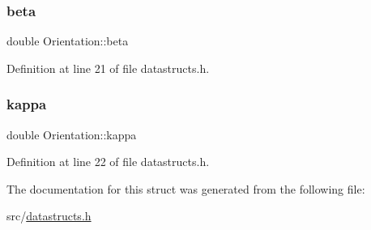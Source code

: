 \subsubsection{\texorpdfstring{beta}{beta}}
{\footnotesize\ttfamily double Orientation\+::beta}



Definition at line 21 of file datastructs.\+h.

\mbox{\label{struct_orientation_a483c403b991cf9ba87eddbbd2fb7875f}} 
\subsubsection{\texorpdfstring{kappa}{kappa}}
{\footnotesize\ttfamily double Orientation\+::kappa}



Definition at line 22 of file datastructs.\+h.



The documentation for this struct was generated from the following file\+:\begin{DoxyCompactItemize}
\item 
src/\mbox{\hyperlink{datastructs_8h}{datastructs.\+h}}\end{DoxyCompactItemize}
